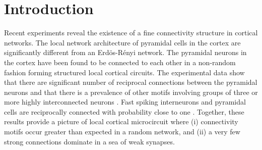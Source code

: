 
\section{Introduction}

Recent experiments reveal the existence of a fine connectivity structure in cortical networks. The local network architecture of pyramidal cells in the cortex are significantly different from an Erdös-Rényi network. The pyramidal neurons in the cortex have been found to be connected to each other in a non-random fashion forming structured local cortical circuits. The experimental data show that there are significant number of reciprocal connections between the pyramidal neurons and that there is a prevalence of other motifs involving groups of three or more highly interconnected neurons \cite{markram1997,thomson2002, Song2005, Perin2011}. Fast spiking interneurons and pyramidal cells are reciprocally connected with probability close to one \cite{Yoshimura2005}. Together, these results provide a picture of local cortical microcircuit where (i) connectivity motifs occur greater than expected in a random network, and (ii) a very few strong connections dominate in a sea of weak synapses.

